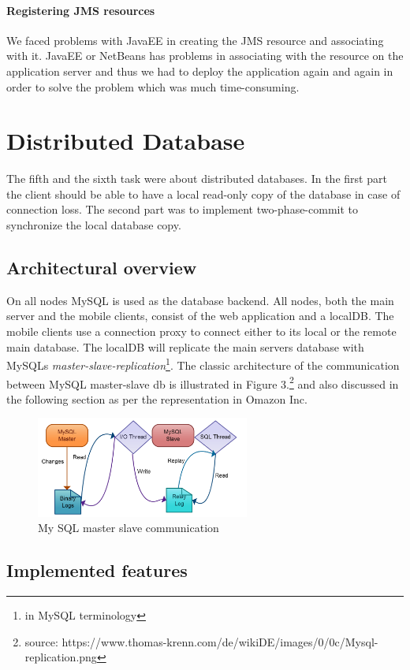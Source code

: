 \documentclass[twoside,colorbacktitle,accentcolor=tud1b]{tudexercise}
\begin{document}
\paragraph{Registering JMS resources}
We faced problems with JavaEE in creating the JMS resource and associating with it. JavaEE or NetBeans has problems in associating with the resource on the application server and thus we had to deploy the application again and again in order to solve the problem which was much time-consuming.

\section{Distributed Database}
The fifth and the sixth task were about distributed databases.
In the first part the client should be able to have a local read-only copy of the database in case of connection loss.
The second part was to implement two-phase-commit to synchronize the local database copy.

\subsection{Architectural overview}
On all nodes MySQL is used as the database backend.
All nodes, both the main server and the mobile clients, consist of the web application and a \ac{localDB}.
The mobile clients use a connection proxy to connect either to its local or the remote main database.
The \ac{localDB} will replicate the main servers database with MySQLs \textit{master-slave-replication}\footnote{in MySQL terminology}. The classic architecture of the communication between MySQL master-slave db is illustrated in Figure 3.\footnote{source: https://www.thomas-krenn.com/de/wikiDE/images/0/0c/Mysql-replication.png} and also discussed in the following section as per the representation in Omazon Inc.

\begin{figure}[h!]
  \centering
   \includegraphics[width=70mm]{MySQLMasterSlave}
   \caption{My SQL master slave communication}
\end{figure}

\subsection{Implemented features}
\end{document}
